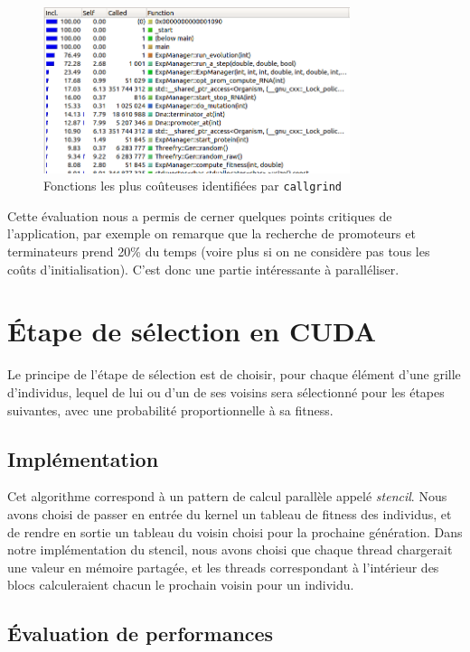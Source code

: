 \documentclass{article}
\begin{document}
\begin{figure}[H]
\centering
\includegraphics[width=0.8\textwidth]{callgrind.png}
\caption{Fonctions les plus coûteuses identifiées par \texttt{callgrind}}
\label{fig:callgrind}
\end{figure}

Cette évaluation nous a permis de cerner quelques points critiques de l'application, par exemple on remarque que la recherche de promoteurs et terminateurs prend 20\% du temps (voire plus si on ne considère pas tous les coûts d'initialisation). C'est donc une partie intéressante à paralléliser.

\section{Étape de sélection en CUDA}

Le principe de l'étape de sélection est de choisir, pour chaque élément d'une grille d'individus, lequel de lui ou d'un de ses voisins sera sélectionné pour les étapes suivantes, avec une probabilité proportionnelle à sa fitness.

\subsection{Implémentation}

Cet algorithme correspond à un pattern de calcul parallèle appelé \textit{stencil}. Nous avons choisi de passer en entrée du kernel un tableau de fitness des individus, et de rendre en sortie un tableau du voisin choisi pour la prochaine génération. Dans notre implémentation du stencil, nous avons choisi que chaque thread chargerait une valeur en mémoire partagée, et les threads correspondant à l'intérieur des blocs calculeraient chacun le prochain voisin pour un individu.

\subsection{Évaluation de performances}
\end{document}
